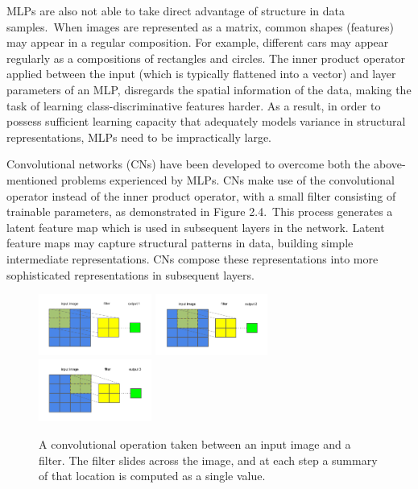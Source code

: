 \noindent MLPs are also not able to take direct advantage of structure in data samples.\ When images are represented as a matrix, common shapes (features) may appear in a regular composition. For example, different cars may appear regularly as a compositions of rectangles and circles. The inner product operator applied between the input (which is typically flattened into a vector) and layer parameters of an MLP, disregards the spatial information of the data, making the task of learning class-discriminative features harder. As a result, in order to possess sufficient learning capacity that adequately models variance in structural representations, MLPs need to be impractically large. \par

\noindent Convolutional networks (CNs) have been developed to overcome both the above-mentioned problems experienced by MLPs. CNs make use of the convolutional operator instead of the inner product operator, with a small filter consisting of trainable parameters, as demonstrated in Figure 2.4.\ This process generates a latent feature map which is used in subsequent layers in the network. Latent feature maps may capture structural patterns in data, building simple intermediate representations. CNs compose these representations into more sophisticated representations in subsequent layers. \par 

\begin{figure}[H]
	\centering
	\includegraphics[width=0.33\textwidth, height=0.25\textwidth]{convolution1}\hfill
	\includegraphics[width=0.33\textwidth, height=0.25\textwidth]{convolution2}\hfill
	\includegraphics[width=0.33\textwidth, height=0.25\textwidth]{convolution3}
	\captionsetup{justification=centering}
	\caption{A convolutional operation taken between an input image and a filter. The filter slides across the image, and at each step a summary of that location is computed as a single value.}
\end{figure}

